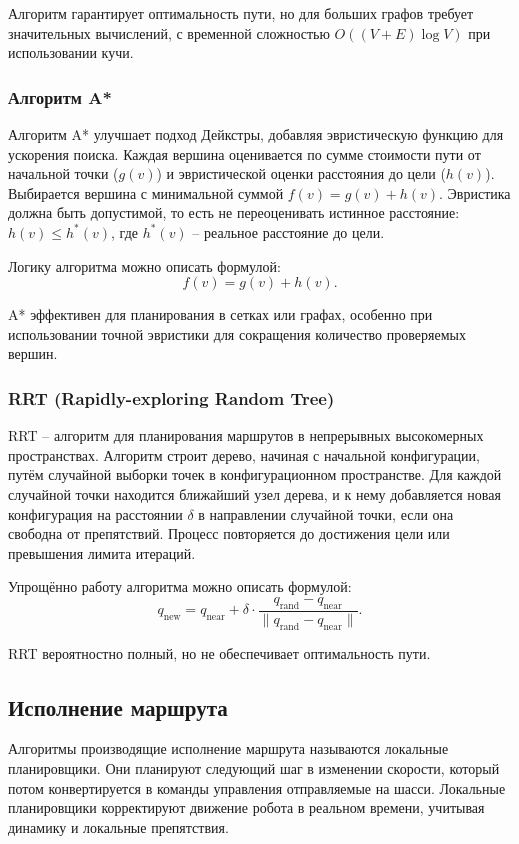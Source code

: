 Алгоритм гарантирует оптимальность пути,
но для больших графов требует значительных вычислений,
с временной сложностью $O((V + E) \log V)$ при использовании кучи.

\subsubsection{Алгоритм A*}
Алгоритм A* улучшает подход Дейкстры,
добавляя эвристическую функцию для ускорения поиска.
Каждая вершина оценивается по сумме стоимости пути от начальной точки ($g(v)$)
и эвристической оценки расстояния до цели ($h(v)$).
Выбирается вершина с минимальной суммой $f(v) = g(v) + h(v)$.
Эвристика должна быть допустимой, то есть не переоценивать истинное расстояние: $h(v) \leq h^*(v)$,
где $h^*(v)$ -- реальное расстояние до цели.

Логику алгоритма можно описать формулой:
\begin{equation}
f(v) = g(v) + h(v).
\end{equation}

A* эффективен для планирования в сетках или графах,
особенно при использовании точной эвристики для сокращения количество проверяемых вершин.

\subsubsection{RRT (Rapidly-exploring Random Tree)}
RRT -- алгоритм для планирования маршрутов в непрерывных высокомерных
пространствах. Алгоритм строит дерево, начиная с начальной конфигурации, путём
случайной выборки точек в конфигурационном пространстве. Для каждой случайной
точки находится ближайший узел дерева, и к нему добавляется новая конфигурация
на расстоянии $\delta$ в направлении случайной точки, если она свободна от
препятствий. Процесс повторяется до достижения цели или превышения лимита
итераций.

Упрощённо работу алгоритма можно описать формулой:
\begin{equation}
q_{\text{new}} = q_{\text{near}} + \delta \cdot \frac{q_{\text{rand}} - q_{\text{near}}}{\| q_{\text{rand}} - q_{\text{near}} \|}.
\end{equation}

RRT вероятностно полный, но не обеспечивает оптимальность пути.

\subsection{Исполнение маршрута}
Алгоритмы производящие исполнение маршрута называются локальные планировщики.
Они планируют следующий шаг в изменении скорости, который потом конвертируется в
команды управления отправляемые на шасси.
Локальные планировщики корректируют движение робота в реальном времени, учитывая
динамику и локальные препятствия.

